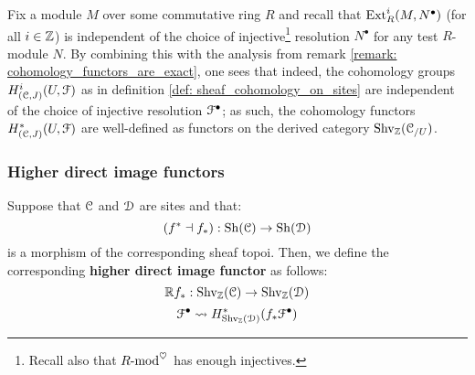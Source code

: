             \begin{remark} \label{remark: resolution_independence_of_cohomology_functors}
                Fix a module $M$ over some commutative ring $R$ and recall that $\mathrm{Ext}^i_R(M, N^{\bullet})$ (for all $i \in \mathbb{Z}$) is independent of the choice of injective\footnote{Recall also that $R\text{-}\mathrm{mod}^{\heartsuit}$ has enough injectives.} resolution $N^{\bullet}$ for any test $R$-module $N$. By combining this with the analysis from remark \ref{remark: cohomology_functors_are_exact}, one sees that indeed, the cohomology groups $H^i_{(\mathcal{C}, J)}(U, \mathcal{F})$ as in definition \ref{def: sheaf_cohomology_on_sites} are independent of the choice of injective resolution $\mathcal{F}^{\bullet}$; as such, the cohomology functors $H^*_{(\mathcal{C}, J)}(U, \mathcal{F})$ are well-defined as functors on the derived category $\mathrm{Shv}_{\mathbb{Z}}(\mathcal{C}_{/U})$.
            \end{remark}
        
        \subsubsection{Higher direct image functors}
            \begin{definition} \label{def: higher_direct_images}
                Suppose that $\mathcal{C}$ and $\mathcal{D}$ are sites and that:
                    $$(f^* \dashv f_*): \mathrm{Sh}(\mathcal{C}) \to \mathrm{Sh}(\mathcal{D})$$
                is a morphism of the corresponding sheaf topoi. Then, we define the corresponding \textbf{higher direct image functor} as follows:
                    $$\mathbb{R} f_*: \mathrm{Shv}_{\mathbb{Z}}(\mathcal{C}) \to \mathrm{Shv}_{\mathbb{Z}}(\mathcal{D})$$
                    $$\mathcal{F}^{\bullet} \leadsto H^*_{\mathrm{Shv}_{\mathbb{Z}}(\mathcal{D})}(f_* \mathcal{F}^{\bullet})$$
            \end{definition}